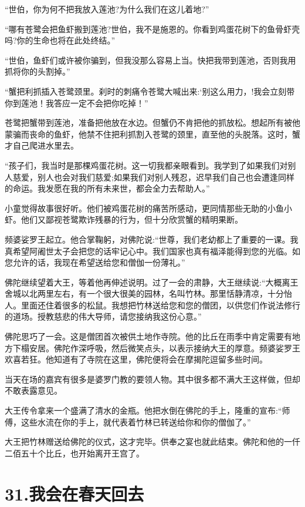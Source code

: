 \documentclass[12pt,twoside,openany]{book}
\begin{document}
“世伯，你为何不把我放入莲池?为什么我们在这儿着地?”

“哪有苍鹭会把鱼虾搬到莲池?世伯，我不是施恩的。你看到鸡蛋花树下的鱼骨虾壳吗?你的生命也将在此处终结。”

“世伯，鱼虾们或许被你骗到，但我没那么容易上当。快把我带到莲池，否则我用抓将你的头割掉。”

“蟹把利抓插入苍鹭颈里。刹时的刺痛令苍鹭大喊出来:‘别这么用力，!我会立刻带你到莲池！我答应一定不会把你吃掉！”

苍鹭把蟹带到莲池，准备把他放在水边。但蟹仍不肯把他的抓放松。想起所有被他蒙骗而丧命的鱼虾，他禁不住把利抓割入苍鹭的颈里，直至他的头脱落。这时，蟹才自己爬进水里去。

“孩子们，我当时是那棵鸡蛋花树。这一切我都亲眼看到。我学到了如果我们对别人慈爱，别人也会对我们慈爱;如果我们对别人残忍，迟早我们自己也会遭逢同样的命运。我发愿在我的所有未来世，都会全力去帮助人。”

小童觉得故事很好听。他们被鸡蛋花树的痛苦所感动，更同情那些无助的小鱼小虾。他们又鄙视苍鹭欺诈残暴的行为，但十分欣赏蟹的精明果断。

频婆娑罗王起立。他合掌鞠躬，对佛陀说:“世尊，我们老幼都上了重要的一课。我真希望阿阇世太子会把您的话牢记心中。我们国家也真有福泽能得到您的光临。如您允许的话，我现在希望送给您和僧伽一份薄礼。”

佛陀继续望着大王，等着他再伸述说明。过了一会的肃静，大王继续说:“大概离王舍城以北两里左右，有一个很大很美的园林，名叫竹林。那里恬静清凉，十分怡人。里面还住着很多的松鼠。我想把竹林送给您和您的僧团，以供您们作说法修行的道场。授教慈悲的伟大导师，请您接纳我这份心意。”

佛陀思巧了一会。这是僧团首次被供土地作寺院。他的比丘在雨季中肯定需要有地方下榻安居。佛陀作深呼吸，然后微笑点头，以表示接纳大王的厚意。频婆娑罗王欢喜若狂。他知道有了寺院在这里，佛陀便将会在摩揭陀逗留多些时间。

当天在场的嘉宾有很多是婆罗门教的要领人物。其中很多都不满大王这样做，但却不敢表露意见。

大王传令拿来一个盛满了清水的金瓶。他把水倒在佛陀的手上，隆重的宣布:“师傅，这些水流在你的手上，就代表着竹林已转送给你和你的僧伽了。”

大王把竹林赠送给佛陀的仪式，这才完毕。供奉之宴也就此结束。佛陀和他的一仟二佰五十个比丘，也开始离开王宫了。


\chapter{31.我会在春天回去}\label{ch31}
\end{document}
